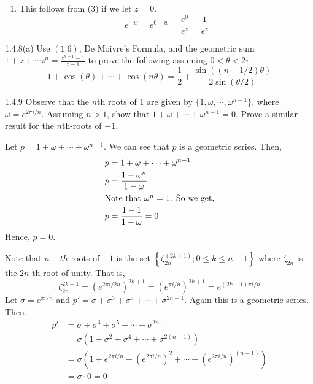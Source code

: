 \documentclass[12pt]{article}
\begin{document}
\begin{solution}
\begin{enumerate}
        \item This follows from (3) if we let $z = 0$. 
        \[e^{-w} = e^{0 - w} = \frac{e^0}{e^z} = \frac{1}{e^z}\]
    \end{enumerate}
\end{solution}

\newpage

\begin{problem}{1.4.8(a)}
    Use $(1.6)$, De Moivre's Formula, and the geometric sum $1+z + \cdots z^n = \frac{z^{n+1}-1}{z-1}$ to prove the following assuming $0 < \theta < 2\pi$. 
    \[ 1 + \cos(\theta) + \cdots + \cos(n\theta) = \frac{1}{2} + \frac{\sin((n+1/2)\theta)}{2\sin(\theta/2)}\]
\end{problem}

\begin{solution}     
        \bbni

\end{solution}


\begin{problem}{1.4.9}
    Observe that the $n$th roots of $1$ are given by $\{1, \omega, \cdots, \omega^{n-1}\}$, where $\omega = e^{2\pi i/n}$. Assuming $n > 1$, show that $1+\omega+\cdots+\omega^{n-1} = 0$. Prove a similar result for the $n$th-roots of $-1$. 
\end{problem}

\begin{solution}
    \bbni
    Let $p = 1+\omega+\cdots+\omega^{n-1}$. We can see that $p$ is a geometric series. 
    Then, 
    \begin{align*}
        p &= 1+\omega+\cdots+\omega^{n-1} \\ 
        p &= \frac{1 - \omega^n}{1 - \omega} \\ 
        \intertext{Note that $\omega ^ n = 1$. So we get,} 
        p &= \frac{1 - 1}{ 1 - \omega} = 0
    \end{align*}
    Hence, $p = 0$. 

    Note that $n-th$ roots of $-1$ is the set $\left \{\zeta_{2n}^{(2k+1)}; 0 \leq k \leq n-1 \right \}$ where $\zeta_{2n}$ is the $2n$-th root of unity. That is, 
    \[\zeta_{2n}^{2k+1} = (e^{2\pi i / 2n})^{2k+1} = (e^{\pi i / n})^{2k+1} = e^{(2k+1)\pi i/n}\] 
    Let $\sigma = e^{\pi i /n}$ and $p' = \sigma + \sigma^3 + \sigma ^5 +  \cdots + \sigma^{2n-1}$. Again this is a geometric series. Then, 
    \begin{align*}
        p' &= \sigma + \sigma^3 + \sigma ^5 +  \cdots + \sigma^{2n-1} \\ 
         &= \sigma \left ( 1 + \sigma^2 + \sigma ^4 +  \cdots + \sigma^{2(n-1)} \right ) \\ 
         &= \sigma \left ( 1 + e^{2\pi i /n} + (e^{2\pi i /n}) ^2 +  \cdots + (e^{2\pi i /n})^{(n-1)} \right ) \\ 
         &= \sigma \cdot 0 = 0   
    \end{align*}
\end{solution}
\end{document}
